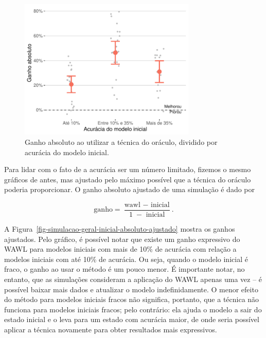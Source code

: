 \documentclass[12pt,twoside,brazilian]{book}
\begin{document}
\begin{figure}

{\centering \includegraphics[width=0.75\textwidth,height=\textheight]{./resultados_files/figure-pdf/fig-simulacao-geral-inicial-absoluto-1.pdf}

}

\caption{\label{fig-simulacao-geral-inicial-absoluto}Ganho absoluto ao
utilizar a técnica do oráculo, dividido por acurácia do modelo inicial.}

\end{figure}

Para lidar com o fato de a acurácia ser um número limitado, fizemos o
mesmo gráficos de antes, mas ajustado pelo máximo possível que a técnica
do oráculo poderia proporcionar. O ganho absoluto ajustado de uma
simulação é dado por

\[
\text{ganho} = \frac{\text{wawl } - \text{ inicial}}{1\; - \text{ inicial}}.
\]

A Figura~\ref{fig-simulacao-geral-inicial-absoluto-ajustado} mostra os
ganhos ajustados. Pelo gráfico, é possível notar que existe um ganho
expressivo do WAWL para modelos iniciais com mais de 10\% de acurácia
com relação a modelos iniciais com até 10\% de acurácia. Ou seja, quando
o modelo inicial é fraco, o ganho ao usar o método é um pouco menor. É
importante notar, no entanto, que as simulações consideram a aplicação
do WAWL apenas uma vez -- é possível baixar mais dados e atualizar o
modelo indefinidamente. O menor efeito do método para modelos iniciais
fracos não significa, portanto, que a técnica não funciona para modelos
iniciais fracos; pelo contrário: ela ajuda o modelo a sair do estado
inicial e o leva para um estado com acurácia maior, de onde seria
possível aplicar a técnica novamente para obter resultados mais
expressivos.
\end{document}
